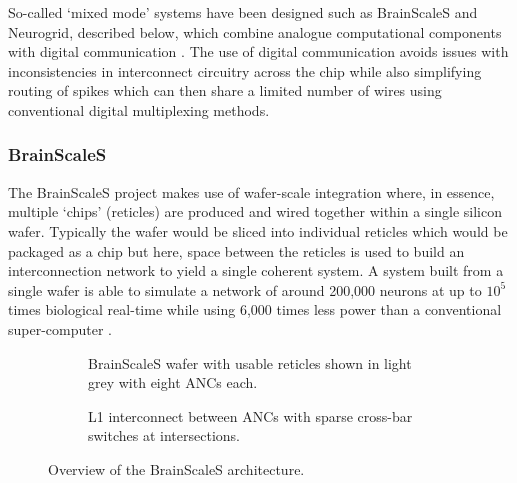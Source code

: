 			So-called `mixed mode' systems have been designed such as BrainScaleS and
			Neurogrid, described below, which combine analogue computational
			components with digital communication \cite{maguire07,benjamin14}. The use
			of digital communication avoids issues with inconsistencies in
			interconnect circuitry across the chip while also simplifying routing of
			spikes which can then share a limited number of wires using conventional
			digital multiplexing methods.
			
			\subsubsection{BrainScaleS}
				
				
				The BrainScaleS project makes use of wafer-scale integration where, in
				essence, multiple `chips' (reticles) are produced and wired together
				within a single silicon wafer. Typically the wafer would be sliced into
				individual reticles which would be packaged as a chip but here, space
				between the reticles is used to build an interconnection network to
				yield a single coherent system. A system built from a single wafer is
				able to simulate a network of around 200,000 neurons at up to $10^5$
				times biological real-time while using 6,000 times less power than a
				conventional super-computer \cite{schemmel08}.
				
				\begin{figure}
					\center
					\begin{subfigure}[b]{0.45\textwidth}
						\center
						
						\caption{BrainScaleS wafer with usable reticles shown in light
						grey with eight ANCs each.}
						\label{fig:brainscales-wafer}
					\end{subfigure}
					\hspace{1ex}
					\begin{subfigure}[b]{0.45\textwidth}
						\center
						
						\caption{L1 interconnect between ANCs with sparse cross-bar
						switches at intersections.}
						\label{fig:brainscales-l1}
					\end{subfigure}
					
					\caption{Overview of the BrainScaleS architecture.}
					\label{fig:brainscales-topology}
				\end{figure}
				
